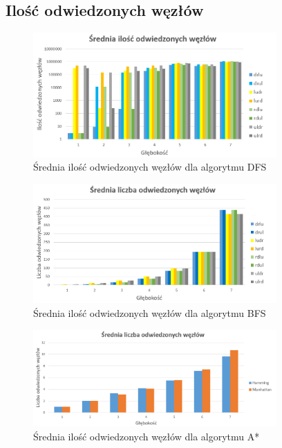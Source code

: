 \documentclass{classrep}
\begin{document}
\newpage
\subsection{Ilość odwiedzonych węzłów}
\begin{figure}[h!]
    \centering
    \includegraphics[width=0.83\textwidth]{visitedDFS.png}
    \caption{Średnia ilość odwiedzonych węzłów dla algorytmu DFS}
	\label{visitedDFS}
\end{figure}
\begin{figure}[h!]
    \centering
    \includegraphics[width=0.83\textwidth]{visitedBFS.png}
    \caption{Średnia ilość odwiedzonych węzłów dla algorytmu BFS}
	\label{visitedBFS}
\end{figure}
\begin{figure}[h!]
    \centering
    \includegraphics[width=0.83\textwidth]{visitedastar.png}
    \caption{Średnia ilość odwiedzonych węzłów dla algorytmu A*}
	\label{visitedASTR}
\end{figure}
\end{document}
